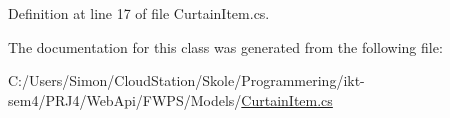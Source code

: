 Definition at line 17 of file Curtain\+Item.\+cs.



The documentation for this class was generated from the following file\+:\begin{DoxyCompactItemize}
\item 
C\+:/\+Users/\+Simon/\+Cloud\+Station/\+Skole/\+Programmering/ikt-\/sem4/\+P\+R\+J4/\+Web\+Api/\+F\+W\+P\+S/\+Models/\mbox{\hyperlink{_curtain_item_8cs}{Curtain\+Item.\+cs}}\end{DoxyCompactItemize}
